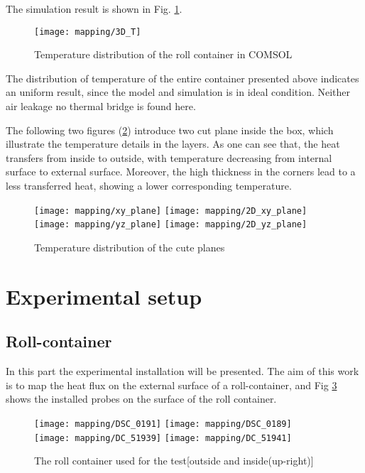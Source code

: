 The simulation result is shown in Fig. \ref{3D_T}. 
\begin{figure}[!htbp]
	\centering
	\texttt{[image: mapping/3D\_T]}
	\caption{Temperature distribution of the roll container in COMSOL}
	\label{3D_T}
\end{figure}

The distribution of temperature of the entire container presented above indicates an uniform result, since the model and simulation is in ideal condition. Neither air leakage no thermal bridge is found here.

The following two figures (\ref{cut_plane}) introduce two cut plane inside the box, which illustrate the temperature details in the layers. As one can see that, the heat transfers from inside to outside, with temperature decreasing from internal surface to external surface. Moreover, the high thickness in the corners lead to a less transferred heat, showing a lower corresponding temperature.
\begin{figure} [htbp]
	\hspace{-20pt}
	\texttt{[image: mapping/xy\_plane]}
	\texttt{[image: mapping/2D\_xy\_plane]}
	\vspace{5pt}
	\hspace{-20pt}
	\texttt{[image: mapping/yz\_plane]}
	\texttt{[image: mapping/2D\_yz\_plane]}
	\caption{Temperature distribution of the cute planes}
	\label{cut_plane}
\end{figure}

\section{Experimental setup}
\subsection{Roll-container}
In this part the experimental installation will be presented. The aim of this work is to map the heat flux on the external surface of a roll-container, and Fig \ref{box} shows the installed probes on the surface of the roll container.

\begin{figure}[!htbp]
	\centering
	\texttt{[image: mapping/DSC\_0191]}
	\texttt{[image: mapping/DSC\_0189]}\\
	\vspace{4pt}
	\texttt{[image: mapping/DC\_51939]}
	\texttt{[image: mapping/DC\_51941]}
	\caption{The roll container used for the test[outside and inside(up-right)]}
	\label{box}
\end{figure}

